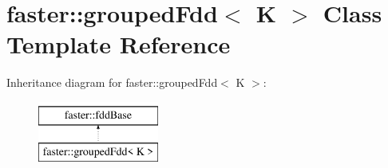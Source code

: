 \hypertarget{classfaster_1_1groupedFdd}{}\section{faster\+:\+:grouped\+Fdd$<$ K $>$ Class Template Reference}
\label{classfaster_1_1groupedFdd}
Inheritance diagram for faster\+:\+:grouped\+Fdd$<$ K $>$\+:\begin{figure}[H]
\begin{center}
\leavevmode
\includegraphics[height=2.000000cm]{classfaster_1_1groupedFdd}
\end{center}
\end{figure}
